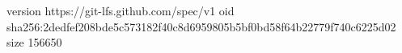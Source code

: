 version https://git-lfs.github.com/spec/v1
oid sha256:2dedfef208bde5c573182f40c8d6959805b5bf0bd58f64b22779f740c6225d02
size 156650
